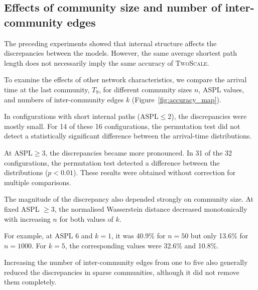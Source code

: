 \documentclass[a4paper,fleqn]{cas-sc}
\newcommand{\TS}{\textup{\textsc{TwoScale}}}
\begin{document}
\subsection{Effects of community size and number of inter-community edges}
\label{sec:res_size}

The preceding experiments showed that internal structure affects the discrepancies between the models. However, the same average shortest path length does not necessarily imply the same accuracy of \TS{}.

To examine the effects of other network characteristics, we compare the arrival time at the last community, $T_9$, for different community sizes $n$, ASPL values, and numbers of inter-community edges $k$ (Figure~\ref{fig:accuracy_map}).

In configurations with short internal paths ($\mathrm{ASPL}\leq2$), the discrepancies were mostly small. For 14 of these 16 configurations, the permutation test did not detect a statistically significant difference between the arrival-time distributions.

At $\mathrm{ASPL}\geq3$, the discrepancies became more pronounced. In 31 of the 32 configurations, the permutation test detected a difference between the distributions ($p<0.01$). These results were obtained without correction for multiple comparisons.

The magnitude of the discrepancy also depended strongly on community size. At fixed ASPL $\geq3$, the normalised Wasserstein distance decreased monotonically with increasing $n$ for both values of $k$.

For example, at ASPL 6 and $k=1$, it was 40.9\% for $n=50$ but only 13.6\% for $n=1000$. For $k=5$, the corresponding values were 32.6\% and 10.8\%.

Increasing the number of inter-community edges from one to five also generally reduced the discrepancies in sparse communities, although it did not remove them completely.
\end{document}
